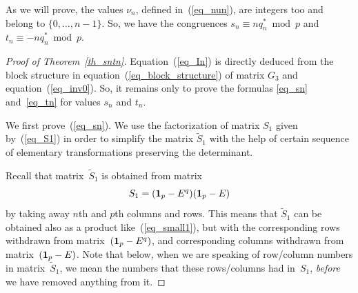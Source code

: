 \documentclass[pdftex]{sigma}
\begin{document}
\begin{remark}
As we will prove, the values $\nu_n$, def\/ined in~(\ref{eq_nun}), are integers too and belong to $\{0, \ldots, n-1\}$. So, we have the congruences $s_n \equiv nq^*_n \bmod p$ and $t_n \equiv - nq^*_n \bmod p$.
\end{remark}

\begin{proof}[Proof of Theorem~\ref{th_sntn}]

Equation~(\ref{eq_In}) is directly deduced from the block structure in equation~(\ref{eq_block_structure}) of matrix $G_3$ and equation~(\ref{eq_inv0}). So, it remains only to prove the formulas \eqref{eq_sn} and~\eqref{eq_tn} for values $s_n$ and $t_n$.

We f\/irst prove~(\ref{eq_sn}). We use the factorization of matrix $S_1$ given by~(\ref{eq_S1}) in order to simplify the matrix $\widetilde S_1$ with the help of certain sequence of elementary transformations preserving the determinant.

Recall that matrix~$\widetilde S_1$ is obtained from matrix
\begin{equation}
S_1 = ({\bf 1}_p - E^q) ({\bf 1}_p - E)
\label{eq_small1}
\end{equation}
by taking away $n$th and $p$th columns and rows. This means that $\widetilde S_1$ can be obtained also as a product like~(\ref{eq_small1}),
but with the corresponding rows withdrawn from matrix~$({\bf 1}_p - E^q)$, and corresponding columns withdrawn from matrix~$({\bf 1}_p - E)$. Note that below, when we are speaking of row/column numbers in matrix~$\widetilde S_1$, we mean the numbers that these rows/columns had in~$S_1$, \emph{before} we have removed anything from it.


\end{proof}
\end{document}
